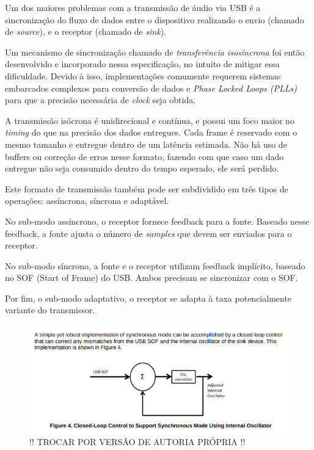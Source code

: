 Um dos maiores problemas com a transmissão de áudio via USB é a sincronização do fluxo de dados entre o dispositivo realizando o envio (chamado de \textit{source}), e o receptor (chamado de \textit{sink}). 

Um mecanismo de sincronização chamado de \textit{transferência isosíncrona} foi então desenvolvido e incorporado nessa especificação, no intuito de mitigar essa dificuldade. Devido à isso, implementações comumente requerem sistemas embarcados complexos para conversão de dados e \textit{Phase Locked Loops (PLLs)} para que a precisão necessária de \textit{clock} seja obtida. 

A transmissão isócrona é unidirecional e contínua, e possui um foco maior no \textit{timing} do que na precisão dos dados entregues. Cada frame é reservado com o mesmo tamanho e entregue dentro de um latência estimada. Não há uso de buffers ou correção de erros nesse formato, fazendo com que caso um dado entregue não seja consumido dentro do tempo esperado, ele será perdido. 

Este formato de transmissão também pode ser subdividido em três tipos de operações: assíncrona, síncrona e adaptável.

No sub-modo assíncrono, o receptor fornece feedback para a fonte. Baseado nesse feedback, a fonte ajusta o número de \textit{samples} que devem ser enviados para o receptor.

No sub-modo síncrono, a fonte e o receptor utilizam feedback implícito, baseado no SOF (Start of Frame) do USB. Ambos precisam se sincronizar com o SOF.

Por fim, o sub-modo adaptativo, o receptor se adapta à taxa potencialmente variante do transmissor. 



\begin{figure}[!h]
  \includegraphics[scale=0.5]{figuras/synchronousmode.png}
  \caption{!! TROCAR POR VERSÃO DE AUTORIA PRÓPRIA !!}
  \label{fig:synchronousMode}
\end{figure}


